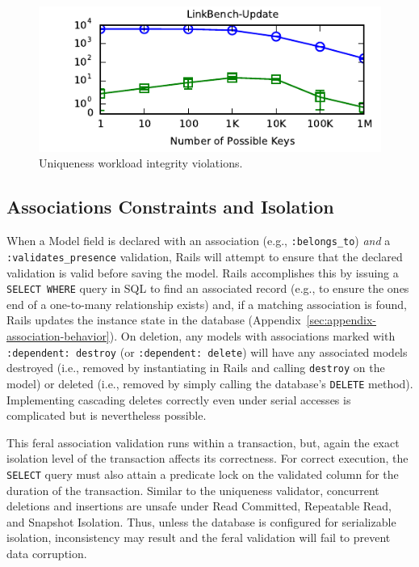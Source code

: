 \begin{figure}
\begin{minipage}{\columnwidth}
\includegraphics[width=1\columnwidth]{figs/pk-workload-linkbench-upd-violations.pdf}\vspace{-1em}
\end{minipage}
\caption{Uniqueness workload integrity violations.}
\label{fig:pk-workload}
\end{figure}


\subsection{Associations Constraints and Isolation}

When a Model field is declared with an association (e.g.,
\texttt{:belongs\_to}) \textit{and} a \texttt{:validates\_presence}
validation, Rails will attempt to ensure that the declared validation
is valid before saving the model. Rails accomplishes this by issuing a
\texttt{SELECT WHERE} query in SQL to find an associated record (e.g.,
to ensure the ones end of a one-to-many relationship exists) and, if a
matching association is found, Rails updates the instance state in the
database (Appendix~\ref{sec:appendix-association-behavior}). On
deletion, any models with associations marked with \texttt{:dependent:
  destroy} (or \texttt{:dependent: delete}) will have any associated
models destroyed (i.e., removed by instantiating in Rails and calling
\texttt{destroy} on the model) or deleted (i.e., removed by simply
calling the database's \texttt{DELETE} method). Implementing cascading
deletes correctly even under serial accesses is complicated but is
nevertheless possible.

This feral association validation runs within a transaction, but,
again the exact isolation level of the transaction affects its
correctness. For correct execution, the \texttt{SELECT} query must
also attain a predicate lock on the validated column for the duration
of the transaction. Similar to the uniqueness validator, concurrent
deletions and insertions are unsafe under Read Committed, Repeatable
Read, and Snapshot Isolation. Thus, unless the database is configured
for serializable isolation, inconsistency may result and the feral
validation will fail to prevent data corruption.


